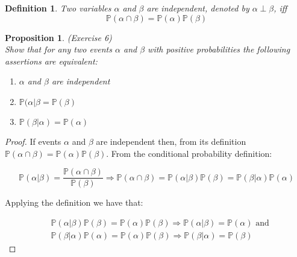 \documentclass{amsart}
\theoremstyle{plain}
\newtheorem*{definition}{Definition}
\newtheorem{proposition}{Proposition}
\newcommand{\pr}{\mathbb{P}}
\begin{document}
\begin{definition}
  Two variables $\alpha$ and $\beta$ are independent, denoted by $\alpha \perp \beta$, iff
  \begin{equation*}
    \pr(\alpha\cap\beta)=\pr(\alpha)\pr(\beta)
  \end{equation*}
\end{definition}

\begin{proposition} (Exercise 6)\\
  Show that for any two events $\alpha$ and $\beta$ with positive probabilities the following
  assertions are equivalent:
  \begin{enumerate}
    \item $\alpha$ and $\beta$ are independent
    \item $\pr(\alpha|\beta=\pr(\beta)$
    \item $\pr(\beta|\alpha)=\pr(\alpha)$
  \end{enumerate}
\end{proposition}

\begin{proof}
  If events $\alpha$ and $\beta$ are independent then, from its definition $\pr(\alpha\cap\beta)=
  \pr(\alpha)\pr(\beta)$. From the conditional probability definition:

  \begin{equation*}
    \pr(\alpha|\beta)=\frac{\pr(\alpha\cap\beta)}{\pr(\beta)}\Rightarrow\pr(\alpha\cap\beta)=
    \pr(\alpha|\beta)\pr(\beta)=\pr(\beta|\alpha)\pr(\alpha)
  \end{equation*}

  Applying the definition we have that:

  \begin{align*}
    &\pr(\alpha|\beta)\pr(\beta)=\pr(\alpha)\pr(\beta)\Rightarrow\pr(\alpha|\beta)=\pr(\alpha)
    \text{\ and}\\
    &\pr(\beta|\alpha)\pr(\alpha)=\pr(\alpha)\pr(\beta)\Rightarrow\pr(\beta|\alpha)=\pr(\beta)
  \end{align*}
\end{proof}

\newpage

\printbibliography[]
\end{document}

